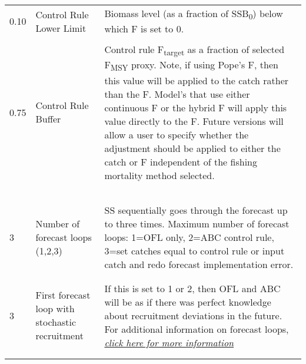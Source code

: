 \begin{landscape}
{\begin{longtable}{p{3.2cm} p{7cm} p{10.8cm}}
 \hline
 0.10 & Control Rule Lower Limit & \multirow{1}{1cm}[-0.25cm]{\parbox{11cm}{Biomass level (as a fraction of SSB\textsubscript{0}) below which F is set to 0.}} \Tstrut\\
   &  & \Bstrut\\
 
 \hline
 0.75 & Control Rule Buffer & \multirow{1}{1cm}[-0.25cm]{\parbox{11cm}{Control rule F\textsubscript{target} as a fraction of selected F\textsubscript{MSY} proxy. Note, if using Pope's F, then this value will be applied to the catch rather than the F.  Model's that use either continuous F or the hybrid F will apply this value directly to the F.  Future versions will allow a user to specify whether the adjustment should be applied to either the catch or F independent of the fishing mortality method selected.}} \Tstrut\\ 
  & & \\
  & & \\
  & & \\
  & & \\
  & & \\
 
 \pagebreak %
 
 3 & Number of forecast loops (1,2,3) & \multirow{1}{1cm}[-0.25cm]{\parbox{11cm}{SS sequentially goes through the forecast up to three times.  Maximum number of forecast loops: 1=OFL only, 2=ABC control rule, 3=set catches equal to control rule or input catch and redo forecast implementation error.}} \Tstrut\\
 & & \Bstrut\\
 & & \Bstrut\\
 
 \hline  
 3 & First forecast loop with stochastic recruitment & \multirow{1}{1cm}[-0.25cm]{\parbox{11cm}{If this is set to 1 or 2, then OFL and ABC will be as if there was perfect knowledge about recruitment deviations in the future. For additional information on forecast loops, \hyperlink{appendB}{\textit{click here for more information}} }} \Tstrut\\
   & & \\
   & & \Bstrut\\
 

\end{longtable}}
\end{landscape}
